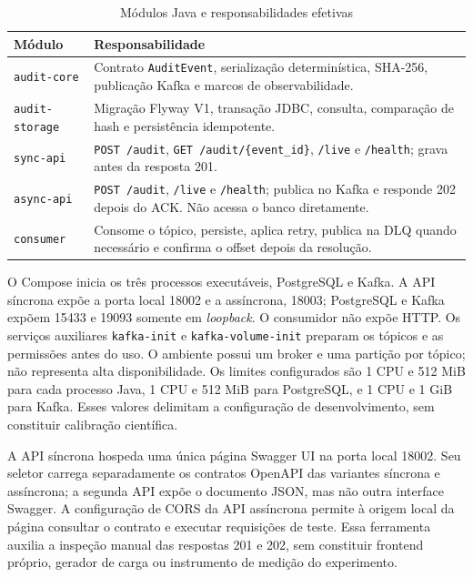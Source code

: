 \begin{table}[htbp]
\centering\small
\caption{Módulos Java e responsabilidades efetivas}\label{tab:modulos-implementados}
\begin{tabular}{p{}p{}}
\hline
Módulo & Responsabilidade\\ \hline
\texttt{audit-core} & Contrato \texttt{AuditEvent}, serialização determinística, SHA-256, publicação Kafka e marcos de observabilidade.\\
\texttt{audit-storage} & Migração Flyway V1, transação JDBC, consulta, comparação de hash e persistência idempotente.\\
\texttt{sync-api} & \texttt{POST /audit}, \texttt{GET /audit/\{event\_id\}}, \texttt{/live} e \texttt{/health}; grava antes da resposta 201.\\
\texttt{async-api} & \texttt{POST /audit}, \texttt{/live} e \texttt{/health}; publica no Kafka e responde 202 depois do ACK. Não acessa o banco diretamente.\\
\texttt{consumer} & Consome o tópico, persiste, aplica retry, publica na DLQ quando necessário e confirma o offset depois da resolução.\\ \hline
\end{tabular}
\end{table}

O Compose inicia os três processos executáveis, PostgreSQL e Kafka. A API síncrona expõe a porta local 18002 e a assíncrona, 18003; PostgreSQL e Kafka expõem 15433 e 19093 somente em \textit{loopback}. O consumidor não expõe HTTP. Os serviços auxiliares \texttt{kafka-init} e \texttt{kafka-volume-init} preparam os tópicos e as permissões antes do uso. O ambiente possui um broker e uma partição por tópico; não representa alta disponibilidade. Os limites configurados são 1 CPU e 512 MiB para cada processo Java, 1 CPU e 512 MiB para PostgreSQL, e 1 CPU e 1 GiB para Kafka. Esses valores delimitam a configuração de desenvolvimento, sem constituir calibração científica.

A API síncrona hospeda uma única página Swagger UI na porta local 18002. Seu seletor carrega separadamente os contratos OpenAPI das variantes síncrona e assíncrona; a segunda API expõe o documento JSON, mas não outra interface Swagger. A configuração de CORS da API assíncrona permite à origem local da página consultar o contrato e executar requisições de teste. Essa ferramenta auxilia a inspeção manual das respostas 201 e 202, sem constituir frontend próprio, gerador de carga ou instrumento de medição do experimento.

